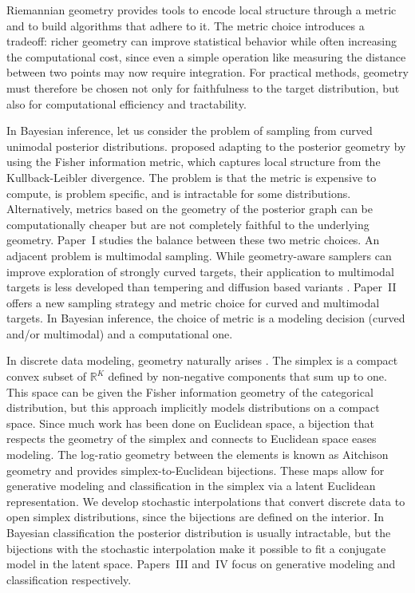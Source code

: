 Riemannian geometry \citep{do1992riemannian,Lee2018} provides tools to encode local structure through a metric and to build algorithms that adhere to it. The metric choice introduces a tradeoff: richer geometry can improve statistical behavior while often increasing the computational cost, since even a simple operation like measuring the distance between two points may now require integration. For practical methods, geometry must therefore be chosen not only for faithfulness to the target distribution, but also for computational efficiency and tractability. 

In Bayesian inference, let us consider the problem of sampling from curved unimodal posterior distributions. \citet{Girolami2011} proposed adapting to the posterior geometry by using the Fisher information metric, which captures local structure from the Kullback-Leibler divergence. The problem is that the metric is expensive to compute, is problem specific, and is intractable for some distributions. Alternatively, metrics based on the geometry of the posterior graph \citep{Hartmann2022, hartmann:2023} can be computationally cheaper but are not completely faithful to the underlying geometry. Paper~I studies the balance between these two metric choices. An adjacent problem is multimodal sampling. While geometry-aware samplers can improve exploration of strongly curved targets, their application to multimodal targets is less developed than tempering and diffusion based variants \citep{Lan2014, Latuszynski2025}. Paper~II offers a new sampling strategy and metric choice for curved and multimodal targets. In Bayesian inference, the choice of metric is a modeling decision (curved and/or multimodal) and a computational one. 

In discrete data modeling, geometry naturally arises \citep{fisher1925theory, Aitchison1986}. The simplex is a compact convex subset of $\mathbb{R}^{K}$  defined by non-negative components that sum up to one. This space can be given the Fisher information geometry of the categorical distribution, but this approach implicitly models distributions on a compact space. Since much work has been done on Euclidean space, a bijection that respects the geometry of the simplex and connects to Euclidean space eases modeling. The log-ratio geometry between the elements is known as Aitchison geometry and provides simplex-to-Euclidean bijections. These maps allow for generative modeling and classification in the simplex via a latent Euclidean representation. We develop stochastic interpolations that convert discrete data to open simplex distributions, since the bijections are defined on the interior. In Bayesian classification the posterior distribution is usually intractable, but the bijections with the stochastic interpolation make it possible to fit a conjugate model in the latent space. Papers~III and~IV focus on generative modeling and classification respectively. 

